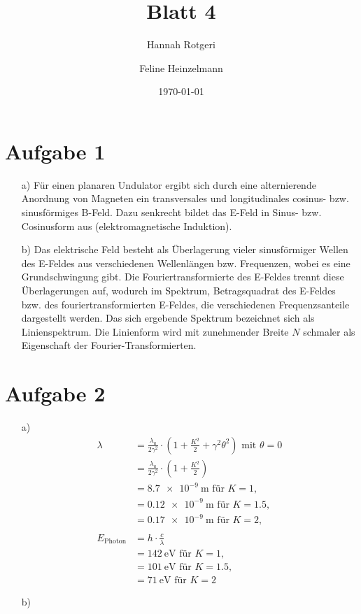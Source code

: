 \documentclass[11pt,a4paper]{article}
\title{Blatt 4}
\date{\today}
\author{Hannah Rotgeri \and Feline Heinzelmann}
\begin{document}
    \maketitle

    \section*{Aufgabe 1}
	\begin{itemize}
		\item[a)]
			Für einen planaren Undulator ergibt sich durch eine alternierende Anordnung von Magneten ein transversales und longitudinales cosinus- bzw. sinusförmiges B-Feld. 
			Dazu senkrecht bildet das E-Feld in Sinus- bzw. Cosinusform aus (elektromagnetische Induktion).
		\item[b)]
			Das elektrische Feld besteht als Überlagerung vieler sinusförmiger Wellen des E-Feldes aus verschiedenen Wellenlängen bzw. Frequenzen, wobei es eine Grundschwingung gibt.
			Die Fouriertransformierte des E-Feldes trennt diese Überlagerungen auf, wodurch im Spektrum, Betragsquadrat des E-Feldes bzw. des fouriertransformierten E-Feldes, 
			die verschiedenen Frequenzsanteile dargestellt werden. Das sich ergebende Spektrum bezeichnet sich als Linienspektrum. 
			Die Linienform wird mit zunehmender Breite $N$ schmaler als Eigenschaft der Fourier-Transformierten.
	\end{itemize}


	
    \section*{Aufgabe 2}

	\begin{itemize}
		\item[a)]
		\begin{align*}
			\lambda &= \frac{\lambda_{u}}{2 \gamma^{2}} \cdot (1 + \frac{K^2}{2} + \gamma^2 \theta^2) \text{ mit } \theta = 0 \\
						&= \frac{\lambda_{u}}{2 \gamma^{2}} \cdot (1 + \frac{K^2}{2} ) \\ 
						&= \SI{8.7e-9}{\meter} \text{ für } K = 1, \\
						&= \SI{0.12e-9}{\meter} \text{ für } K = 1.5, \\
						&= \SI{0.17e-9}{\meter} \text{ für } K = 2, \\
						\\
			E_{\mathrm{Photon}} &= h \cdot \frac{c}{\lambda} \\
									&= \SI{142}{\electronvolt} \text{ für } K = 1, \\
									&= \SI{101}{\electronvolt} \text{ für } K = 1.5, \\
									&= \SI{71}{\electronvolt} \text{ für } K = 2			
		\end{align*}        	
        \item[b)]
			
	\end{itemize}
\end{document}

